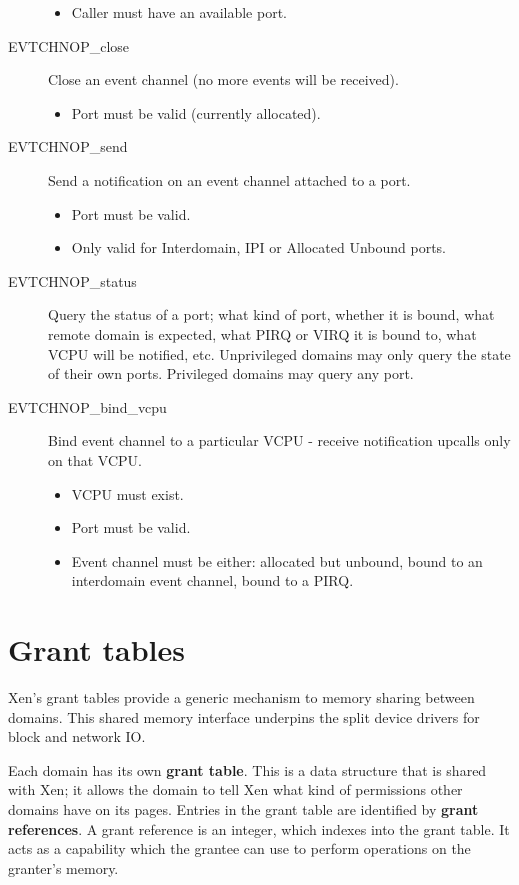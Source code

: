 \documentclass[11pt,twoside,final,openright,a4paper]{report}
\begin{document}
\begin{description}
\begin{itemize}
  \item Caller must have an available port.
  \end{itemize}
\item[EVTCHNOP\_close]
  Close an event channel (no more events will be received).
  \begin{itemize}
  \item Port must be valid (currently allocated).
  \end{itemize}
\item[EVTCHNOP\_send] Send a notification on an event channel attached
  to a port.
  \begin{itemize}
  \item Port must be valid.
  \item Only valid for Interdomain, IPI or Allocated Unbound ports.
  \end{itemize}
\item[EVTCHNOP\_status] Query the status of a port; what kind of port,
  whether it is bound, what remote domain is expected, what PIRQ or
  VIRQ it is bound to, what VCPU will be notified, etc.
  Unprivileged domains may only query the state of their own ports.
  Privileged domains may query any port.
\item[EVTCHNOP\_bind\_vcpu] Bind event channel to a particular VCPU -
  receive notification upcalls only on that VCPU.
  \begin{itemize}
  \item VCPU must exist.
  \item Port must be valid.
  \item Event channel must be either: allocated but unbound, bound to
  an interdomain event channel, bound to a PIRQ.
  \end{itemize}

\end{description}


\chapter{Grant tables}
\label{c:granttables}

Xen's grant tables provide a generic mechanism to memory sharing
between domains.  This shared memory interface underpins the split
device drivers for block and network IO.

Each domain has its own {\bf grant table}.  This is a data structure
that is shared with Xen; it allows the domain to tell Xen what kind of
permissions other domains have on its pages.  Entries in the grant
table are identified by {\bf grant references}.  A grant reference is
an integer, which indexes into the grant table.  It acts as a
capability which the grantee can use to perform operations on the
granter's memory.
\end{document}

